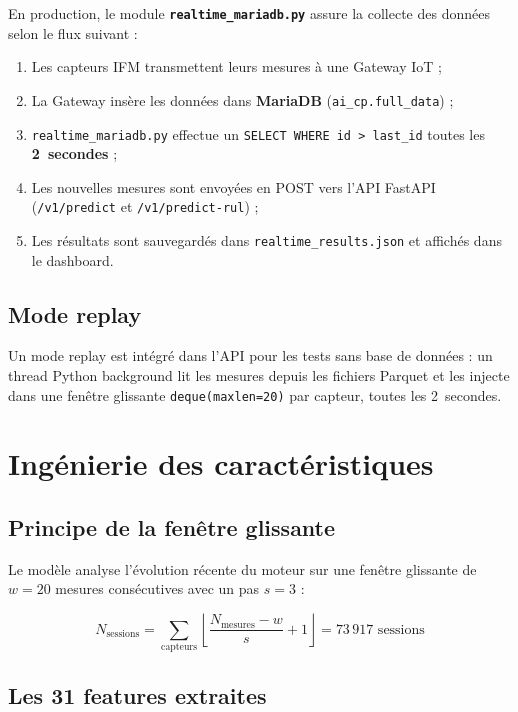 \documentclass[12pt,a4paper]{report}
\begin{document}
En production, le module \textbf{\texttt{realtime\_mariadb.py}} assure la collecte des
données selon le flux suivant :

\begin{enumerate}
  \item Les capteurs IFM transmettent leurs mesures à une Gateway IoT ;
  \item La Gateway insère les données dans \textbf{MariaDB} (\texttt{ai\_cp.full\_data}) ;
  \item \texttt{realtime\_mariadb.py} effectue un \texttt{SELECT WHERE id > last\_id} toutes les \textbf{2~secondes} ;
  \item Les nouvelles mesures sont envoyées en POST vers l'API FastAPI (\texttt{/v1/predict} et \texttt{/v1/predict-rul}) ;
  \item Les résultats sont sauvegardés dans \texttt{realtime\_results.json} et affichés dans le dashboard.
\end{enumerate}

\subsection{Mode replay}

Un mode replay est intégré dans l'API pour les tests sans base de données : un thread
Python background lit les mesures depuis les fichiers Parquet et les injecte dans une
fenêtre glissante \texttt{deque(maxlen=20)} par capteur, toutes les 2~secondes.

\section{Ingénierie des caractéristiques}

\subsection{Principe de la fenêtre glissante}

Le modèle analyse l'évolution récente du moteur sur une fenêtre glissante de
$w = 20$ mesures consécutives avec un pas $s = 3$ :

\begin{equation}
  N_{\text{sessions}} = \sum_{\text{capteurs}} \left\lfloor \frac{N_{\text{mesures}} - w}{s} + 1 \right\rfloor = 73\,917 \text{ sessions}
\end{equation}

\subsection{Les 31 features extraites}
\end{document}
